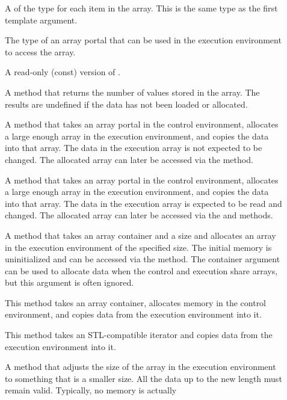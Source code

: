 \begin{description}
\item[] A  of the type for each item
  in the array. This is the same type as the first template argument.
\item[] The type of an array portal that can be used
  in the execution environment to access the array.
\item[] A read-only (const) version of
  .
\item[] A method that returns the number of
  values stored in the array. The results are undefined if the data has not
  been loaded or allocated.
\item[] A method that takes an array portal in
  the control environment, allocates a large enough array in the execution
  environment, and copies the data into that array. The data in the
  execution array is not expected to be changed. The allocated array can
  later be accessed via the  method.
\item[] A method that takes an array portal in
  the control environment, allocates a large enough array in the execution
  environment, and copies the data into that array. The data in the
  execution array is expected to be read and changed. The allocated array
  can later be accessed via the  and
   methods.
\item[] A method that takes an array
  container and a size and allocates an array in the execution environment
  of the specified size. The initial memory is uninitialized and can be
  accessed via the  method. The container argument can
  be used to allocate data when the control and execution share arrays, but
  this argument is often ignored.
\item[] This method takes an array container,
  allocates memory in the control environment, and copies data from the
  execution environment into it.
\item[] This method takes an STL-compatible iterator and
  copies data from the execution environment into it.
\item[] A method that adjusts the size of the array in the
  execution environment to something that is a smaller size. All the data
  up to the new length must remain valid. Typically, no memory is actually

\end{description}
